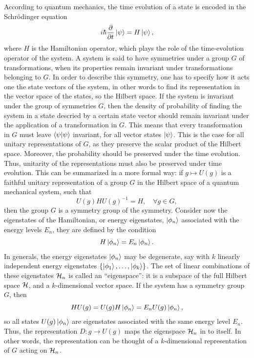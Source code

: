 According to quantum mechanics, the time evolution of a state is encoded in the Schr\"odinger equation
\begin{equation}
    i\hbar\frac{\partial}{\partial t}\ket{\psi} = H\ket{\psi},
\end{equation}
where $H$ is the Hamiltonian operator, which plays the role of the time-evolution operator of the system. A system is said to have symmetries under a group $G$ of transformations, when its properties remain invariant under transformations belonging to $G$. In order to describe this symmetry, one has to specify how it acts one the state vectors of the system, in other words to find its representation in the vector space of the states, so the Hilbert space. If the system is invariant under the group of symmetries $G$, then the density of probability of finding the system in a state descried by a certain state vector should remain invariant under the application of a transformation in $G$. This means that every transformation in $G$ must leave $\langle \psi | \psi \rangle$ invariant, for all vector states $\ket{\psi}$. This is the case for all unitary representations of $G$, as they preserve the scalar product of the Hilbert space. Moreover, the probability should be preserved under the time evolution. Thus, unitarity of the representations must also be preserved under time evolution. This can be summarized in a more formal way: if $g \mapsto U(g)$ is a faithful unitary representation of a group $G$ in the Hilbert space of a quantum mechanical system, such that
\begin{equation}
    U(g)HU(g)^{-1} = H,\quad \forall g \in G,
\end{equation}
then the group $G$ is a symmetry group of the symmetry. Consider now the eigenstates of the Hamiltonian, or energy eigenstates, $\ket{\phi_n}$ associated with the energy levels $E_n$, they are defined by the condition
\begin{equation}
    H\ket{\phi_n} = E_n\ket{\phi_n}.
\end{equation}
In generals, the energy eigenstates $\ket{\phi_n}$ may be degenerate, say with $k$ linearly independent energy eigenstates $\{\ket{\phi_1},\dots,\ket{\phi_k}\}$. The set of linear combinations of these eigenstates $\mathcal{H}_n$ is called an ``eigenspace'': it is a subspace of the full Hilbert space $\mathcal{H}$, and a $k$-dimensional vector space. If the system has a symmetry group $G$, then 
\begin{equation}
    HU(g) = U(g)H\ket{\phi_n} = E_nU(g)\ket{\phi_n},
\end{equation}
so all states $U(g)\ket{\phi_n}$ are eigenstates associated with the same energy level $E_n$. Thus, the representation $D : g \to U(g)$ maps the eigenspace $\mathcal{H}_n$ in to itself. In other words, the representation can be thought of a $k$-dimensional representation of $G$ acting on $\mathcal{H}_n$. 

